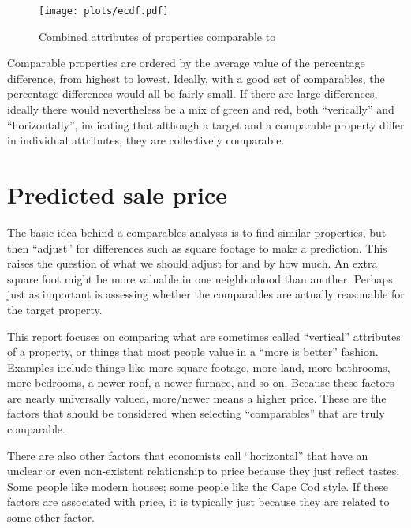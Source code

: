 \documentclass[
12pt, %
letterpaper, %
oneside, %
headinclude,footinclude, %
BCOR5mm, %
]{scrartcl}
\begin{document}
\begin{figure}
\centering
\caption{Combined attributes of properties comparable to \PropertyName{}} \label{fig:ecdf}  
\texttt{[image: plots/ecdf.pdf]} 
\end{figure}

Comparable properties are ordered by the average value of the percentage difference, from highest to lowest.
Ideally, with a good set of comparables, the percentage differences would all be fairly small.
If there are large differences, ideally there would nevertheless be a mix of green and red, both ``verically'' and ``horizontally'', indicating that although a target and a comparable property differ in individual attributes, they are collectively comparable.


\section{Predicted sale price}
The basic idea behind a \href{https://en.wikipedia.org/wiki/Comparables}{comparables} analysis is to find similar properties, but then ``adjust'' for differences such as square footage to make a prediction.
This raises the question of what we should adjust for and by how much.
An extra square foot might be more valuable in one neighborhood than another. 
Perhaps just as important is assessing whether the comparables are actually reasonable for the target property. 

This report focuses on comparing what are sometimes called ``vertical'' attributes of a property, or things that most people value in a ``more is better'' fashion.
Examples include things like more square footage, more land, more bathrooms, more bedrooms, a newer roof, a newer furnace, and so on.
Because these factors are nearly universally valued, more/newer means a higher price.
These are the factors that should be considered when selecting ``comparables'' that are truly comparable. 

There are also other factors that economists call ``horizontal'' that have an unclear or even non-existent relationship to price because they just reflect tastes.
Some people like modern houses; some people like the Cape Cod style.
If these factors are associated with price, it is typically just because they are related to some other factor.
\end{document}
